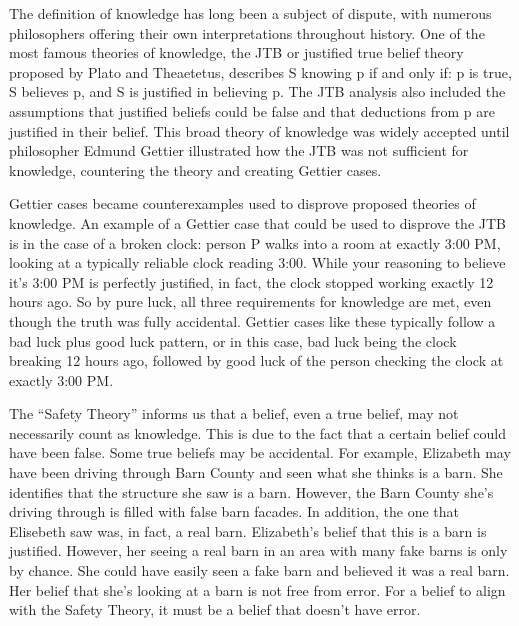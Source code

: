 
The definition of knowledge has long been a subject of dispute, with numerous philosophers offering their own interpretations throughout history. One of the most famous theories of knowledge, the JTB or justified true belief theory proposed by Plato and Theaetetus, describes S knowing p if and only if: p is true, S believes p, and S is justified in believing p. The JTB analysis also included the assumptions that justified beliefs could be false and that deductions from p are justified in their belief. This broad theory of knowledge was widely accepted until philosopher Edmund Gettier illustrated how the JTB was not sufficient for knowledge, countering the theory and creating Gettier cases.

Gettier cases became counterexamples used to disprove proposed theories of knowledge. An example of a Gettier case that could be used to disprove the JTB is in the case of a broken clock: person P walks into a room at exactly 3:00 PM, looking at a typically reliable clock reading 3:00. While your reasoning to believe it’s 3:00 PM is perfectly justified, in fact, the clock stopped working exactly 12 hours ago. So by pure luck, all three requirements for knowledge are met, even though the truth was fully accidental. Gettier cases like these typically follow a bad luck plus good luck pattern, or in this case, bad luck being the clock breaking 12 hours ago, followed by good luck of the person checking the clock at exactly 3:00 PM.

The “Safety Theory” informs us that a belief, even a true belief, may not necessarily count as knowledge. This is due to the fact that a certain belief could have been false. Some true beliefs may be accidental. For example, Elizabeth may have been driving through Barn County and seen what she thinks is a barn. She identifies that the structure she saw is a barn. However, the Barn County she’s driving through is filled with false barn facades. In addition,  the one that Elisebeth saw was, in fact, a real barn. Elizabeth’s belief that this is a barn is justified. However, her seeing a real barn in an area with many fake barns is only by chance. She could have easily seen a fake barn and believed it was a real barn. Her belief that she’s looking at a barn is not free from error. For a belief to align with the Safety Theory, it must be a belief that doesn’t have error.

